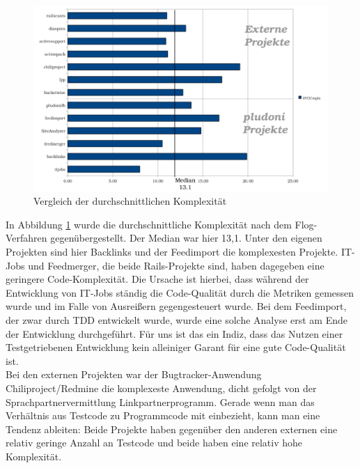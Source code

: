 \begin{figure}[htbp]
 \centering
 \includegraphics[width=\linewidth]{./diagrams/cmp-complex.pdf}
 \caption{Vergleich der durchschnittlichen Komplexität}
 \label{fig:cpm-complex}
\end{figure}
In Abbildung \ref{fig:cpm-complex} wurde die durchschnittliche Komplexität nach dem Flog-Verfahren gegenübergestellt. Der Median war hier 13,1. Unter den eigenen Projekten sind hier Backlinks und der Feedimport die komplexesten Projekte. IT-Jobs und Feedmerger, die beide Rails-Projekte sind, haben dagegeben eine geringere Code-Komplexität. Die Ursache ist hierbei, dass während der Entwicklung von IT-Jobs ständig die Code-Qualität durch die Metriken gemessen wurde und im Falle von Ausreißern gegengesteuert wurde. Bei dem Feedimport, der zwar durch TDD entwickelt wurde, wurde eine solche Analyse erst am Ende der Entwicklung durchgeführt. Für uns ist das ein Indiz, dass das Nutzen einer Testgetriebenen Entwicklung kein alleiniger Garant für eine gute Code-Qualität ist.\\
Bei den externen Projekten war der Bugtracker-Anwendung Chiliproject/Redmine die komplexeste Anwendung, dicht gefolgt von der Sprachpartnervermittlung Linkpartnerprogramm. Gerade wenn man das Verhältnis aus Testcode zu Programmcode mit einbezieht, kann man eine Tendenz ableiten: Beide Projekte haben gegenüber den anderen externen eine relativ geringe Anzahl an Testcode und beide haben eine relativ hohe Komplexität.

